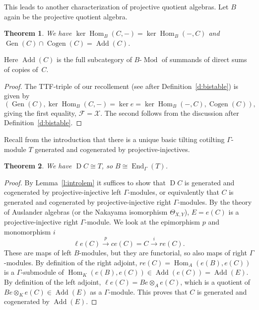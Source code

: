 \documentclass[11pt,a4paper]{amsart}
\theoremstyle{plain}
\newtheorem{thm}{Theorem}[section]
\theoremstyle{definition}
\begin{document}
This leads to another characterization of 
projective quotient algebras.
Let $B$ again be the projective quotient algebra.

\begin{thm}
\label{t:kerhomaddcond}
We have
$\operatorname{ker}\operatorname{Hom}_B(C,-) = \operatorname{ker}\operatorname{Hom}_B(-,C)$
and 
$\operatorname{Gen} (C)\cap \operatorname{Cogen} (C) =\operatorname{Add} (C)$.
\end{thm}

Here $\operatorname{Add} (C)$ is the full subcategory of $B$-$\operatorname{Mod}$ of summands of direct sums of copies of~$C$.

\begin{proof}
The TTF-triple of our recollement (see after Definition~\ref{d:bistable}) is given by 
\[ 
(\operatorname{Gen} (C), \operatorname{ker} \operatorname{Hom}_B(C,-) =\operatorname{ker} {e} =\operatorname{ker} \operatorname{Hom}_B(-,C) , \operatorname{Cogen} (C) ),
\]
giving the first equality, ${\mathcal{F}} = {\mathcal{X}}$.
The second follows from 
the discussion after Definition~\ref{d:bistable}.
\end{proof}

Recall from the introduction that there is a unique basic tilting  cotilting $\Gamma$-module $T$ generated and cogenerated by projective-injectives.

\begin{thm}
\label{t:dct}
We have $\operatorname{D} C \cong T$, so $B \cong \operatorname{End}_\Gamma(T)$.
\end{thm}

\begin{proof}
By Lemma~\ref{l:introlem} it suffices to show that $\operatorname{D} C$ is 
generated and cogenerated by projective-injective left $\Gamma$-modules,
or equivalently that $C$ is generated and cogenerated by projective-injective
right $\Gamma$-modules.
By the theory of Auslander algebras (or the Nakayama isomorphism $\Theta_{X,Y}$),
$E = e(C)$ is a projective-injective right $\Gamma$-module. 
We look at the epimorphism $p$ and monomorphism $i$ 
\[ 
\ell e(C) \xrightarrow{p} c e(C) =C \xrightarrow{i} re (C). 
\]
These are maps of left $B$-modules, but they are functorial, so also
maps of right $\Gamma$-modules. By definition of the right adjoint, $re (C) = \operatorname{Hom}_A (e(B), e(C))$ is a $\Gamma$-submodule of $\operatorname{Hom}_K(e(B), e(C))\in \operatorname{Add} (e(C)) =\operatorname{Add} (E)$. By definition of the left adjoint, $\ell e (C) = Be \otimes_A e(C)$, which is a quotient of $Be \otimes_K e(C)\in \operatorname{Add} (E) $ as a $\Gamma $-module. This proves that $C$ is generated and cogenerated by $\operatorname{Add} (E)$.
\end{proof}
\end{document}

